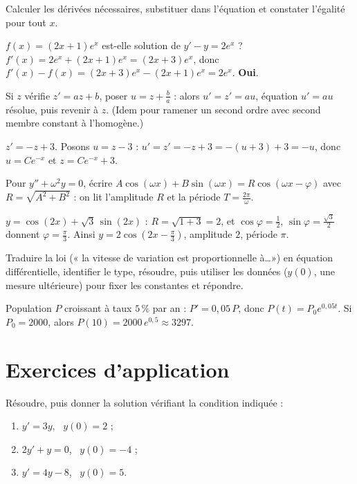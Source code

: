 Calculer les dérivées nécessaires, substituer dans l'équation et constater
l'égalité pour tout $x$.
\begin{exemple}
$f(x)=(2x+1)e^{x}$ est-elle solution de $y'-y=2e^{x}$ ?
$f'(x)=2e^{x}+(2x+1)e^{x}=(2x+3)e^{x}$, donc
$f'(x)-f(x)=(2x+3)e^{x}-(2x+1)e^{x}=2e^{x}$. \textbf{Oui}.
\end{exemple}

Si $z$ vérifie $z'=az+b$, poser $u=z+\frac{b}{a}$ : alors $u'=z'=au$, équation
$u'=au$ résolue, puis revenir à $z$. (Idem pour ramener un second ordre avec
second membre constant à l'homogène.)
\begin{exemple}
$z'=-z+3$. Posons $u=z-3$ : $u'=z'=-z+3=-(u+3)+3=-u$, donc $u=Ce^{-x}$
et $z=Ce^{-x}+3$.
\end{exemple}

Pour $y''+\omega^2 y=0$, écrire
$A\cos(\omega x)+B\sin(\omega x)=R\cos(\omega x-\varphi)$ avec $R=\sqrt{A^2+B^2}$ :
on lit l'amplitude $R$ et la période $T=\frac{2\pi}{\omega}$.
\begin{exemple}
$y=\cos(2x)+\sqrt3\,\sin(2x)$ : $R=\sqrt{1+3}=2$, et $\cos\varphi=\frac12$,
$\sin\varphi=\frac{\sqrt3}{2}$ donnent $\varphi=\frac{\pi}{3}$. Ainsi
$y=2\cos\!\left(2x-\frac{\pi}{3}\right)$, amplitude $2$, période $\pi$.
\end{exemple}

Traduire la loi (« la vitesse de variation est proportionnelle à\dots ») en
équation différentielle, identifier le type, résoudre, puis utiliser les données
($y(0)$, une mesure ultérieure) pour fixer les constantes et répondre.
\begin{exemple}
Population $P$ croissant à taux $5\,\%$ par an : $P'=0{,}05\,P$, donc
$P(t)=P_0 e^{0{,}05t}$. Si $P_0=2000$, alors $P(10)=2000\,e^{0{,}5}\approx 3297$.
\end{exemple}

\section{Exercices d'application}


\exo{} Résoudre, puis donner la solution vérifiant la condition indiquée :
\begin{enumerate}[label=\alph*)]
\item $y'=3y$, \ $y(0)=2$ ;
\item $2y'+y=0$, \ $y(0)=-4$ ;
\item $y'=4y-8$, \ $y(0)=5$.
\end{enumerate}

